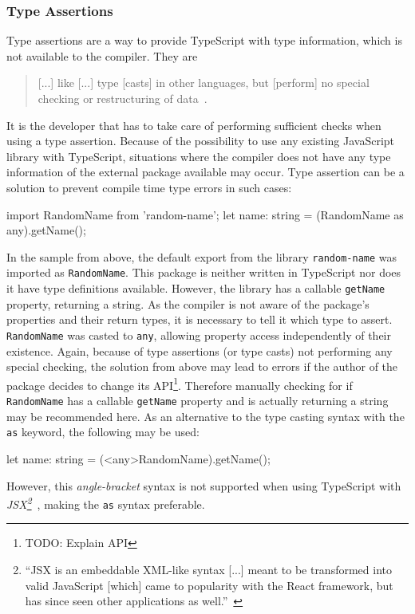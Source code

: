 \subsubsection{Type Assertions}
\label{sec:ts-type-assertions}

Type assertions are a way to provide TypeScript with type information, which is not available to the compiler. They are 
\begin{quote}
  [...] like [...] type [casts] in other languages, but [perform] no special checking or restructuring of data~\cite{TypeScriptHandbook:BasicTypes}.
\end{quote}
It is the developer that has to take care of performing sufficient checks when using a type assertion. Because of the possibility to use any existing JavaScript library with TypeScript, situations where the compiler does not have any type information of the external package available may occur. Type assertion can be a solution to prevent compile time type errors in such cases:
\begin{JsCode}[numbers=none]
import RandomName from 'random-name';
let name: string = (RandomName as any).getName();
\end{JsCode}
In the sample from above, the default export from the library \texttt{random-name} was imported as \texttt{RandomName}. This package is neither written in TypeScript nor does it have type definitions available. However, the library has a callable \texttt{getName} property, returning a string. As the compiler is not aware of the package's properties and their return types, it is necessary to tell it which type to assert. \texttt{RandomName} was casted to \texttt{any}, allowing property access independently of their existence. Again, because of type assertions (or type casts) not performing any special checking, the solution from above may lead to errors if the author of the package decides to change its API\footnote{TODO: Explain API}. Therefore manually checking for if \texttt{RandomName} has a callable \texttt{getName} property and is actually returning a string may be recommended here.
As an alternative to the type casting syntax with the \texttt{as} keyword, the following may be used:
\begin{JsCode}[numbers=none]
let name: string = (<any>RandomName).getName();
\end{JsCode}
However, this \emph{angle-bracket} syntax is not supported when using TypeScript with \emph{JSX\footnote{``JSX is an embeddable XML-like syntax [...] meant to be transformed into valid JavaScript [which] came to popularity with the React framework, but has since seen other applications as well.''~\cite{TypeScriptHandbook:JSX}}}~\cite{TypeScriptHandbook:BasicTypes}, making the \texttt{as} syntax preferable.

